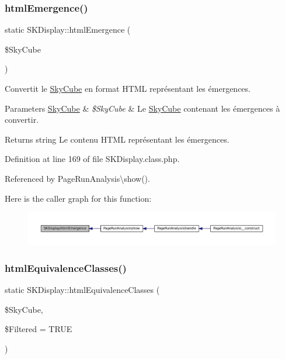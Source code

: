 \subsubsection{\texorpdfstring{html\+Emergence()}{htmlEmergence()}}
{\footnotesize\ttfamily static S\+K\+Display\+::html\+Emergence (\begin{DoxyParamCaption}\item[{}]{\$\+Sky\+Cube }\end{DoxyParamCaption})\hspace{0.3cm}{\ttfamily [static]}}

Convertit le \hyperlink{class_sky_cube}{Sky\+Cube} en format H\+T\+ML représentant les émergences.


\begin{DoxyParams}[1]{Parameters}
\hyperlink{class_sky_cube}{Sky\+Cube} & {\em \$\+Sky\+Cube} & Le \hyperlink{class_sky_cube}{Sky\+Cube} contenant les émergences à convertir. \\
\hline
\end{DoxyParams}
\begin{DoxyReturn}{Returns}
string Le contenu H\+T\+ML représentant les émergences. 
\end{DoxyReturn}


Definition at line 169 of file S\+K\+Display.\+class.\+php.



Referenced by Page\+Run\+Analysis\textbackslash{}show().

Here is the caller graph for this function\+:\nopagebreak
\begin{figure}[H]
\begin{center}
\leavevmode
\includegraphics[width=350pt]{class_s_k_display_a5bc7ad49030fe6da158b2dec6af00055_icgraph}
\end{center}
\end{figure}
\mbox{\label{class_s_k_display_a293dfd4824149602bf52e548f837ea99}} 
\subsubsection{\texorpdfstring{html\+Equivalence\+Classes()}{htmlEquivalenceClasses()}}
{\footnotesize\ttfamily static S\+K\+Display\+::html\+Equivalence\+Classes (\begin{DoxyParamCaption}\item[{}]{\$\+Sky\+Cube,  }\item[{}]{\$\+Filtered = {\ttfamily TRUE} }\end{DoxyParamCaption})\hspace{0.3cm}{\ttfamily [static]}}

